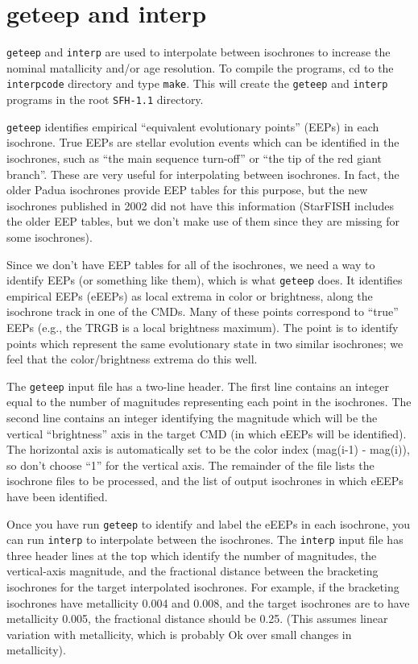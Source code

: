 \documentclass[12pt]{book}
\def\ttg{\tt\color{DarkGreen}}
\begin{document}
\chapter{geteep and interp}

{\ttg geteep} and {\ttg interp} are used to interpolate between 
isochrones to increase the nominal matallicity and/or age resolution.
To compile the programs, cd to the {\ttg interpcode} directory and 
type {\ttg make}.  This will create the {\ttg geteep} and 
{\ttg interp} programs in the root {\ttg SFH-1.1} directory.

{\ttg geteep} identifies empirical ``equivalent evolutionary points''
(EEPs) in each isochrone.  True EEPs are stellar evolution events 
which can be identified in the isochrones, such as ``the main sequence 
turn-off'' or ``the tip of the red giant branch''.  These are very 
useful for interpolating between isochrones.  In fact, the older 
Padua isochrones provide EEP tables for this purpose, but the new
isochrones published in 2002 did not have this information (StarFISH 
includes the older EEP tables, but we don't make use of them since 
they are missing for some isochrones).

Since we don't have EEP tables for all of the isochrones, we need a 
way to identify EEPs (or something like them), which is what 
{\ttg geteep} does.  It identifies empirical EEPs (eEEPs) as local 
extrema in color or brightness, along the isochrone track in one of 
the CMDs.  Many of these points correspond to ``true'' EEPs (e.g., the 
TRGB is a local brightness maximum).  The point is to identify points 
which represent the same evolutionary state in two similar isochrones; 
we feel that the color/brightness extrema do this well.

The {\ttg geteep} input file has a two-line header.  The first line 
contains an integer equal to the number of magnitudes representing 
each point in the isochrones.  The second line contains an integer 
identifying the magnitude which will be the vertical ``brightness'' 
axis in the target CMD (in which eEEPs will be identified).  The 
horizontal axis is automatically set to be the color index 
(mag(i-1) - mag(i)), so don't choose ``1'' for the vertical axis.
The remainder of the file lists the isochrone files to be processed,
and the list of output isochrones in which eEEPs have been identified.

Once you have run {\ttg geteep} to identify and label the eEEPs in 
each isochrone, you can run {\ttg interp} to interpolate between the 
isochrones.  The {\ttg interp} input file has three header lines at 
the top which identify the number of magnitudes, the vertical-axis 
magnitude, and the fractional distance between the bracketing 
isochrones for the target interpolated isochrones.  For example, if 
the bracketing isochrones have metallicity 0.004 and 0.008, and the 
target isochrones are to have metallicity 0.005, the fractional 
distance should be 0.25. (This assumes linear variation with 
metallicity, which is probably Ok over small changes in metallicity).
\end{document}
